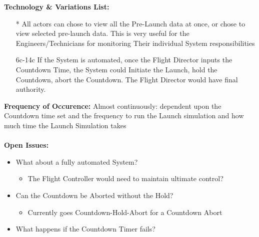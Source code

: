 \documentclass[letterpaper]{article}
\begin{document}
\textbf{Technology \& Variations List: }
\begin{itemize}
\item[*] All actors can chose to view all the Pre-Launch data at once,
or chose to view selected pre-launch data.  This is very useful for the
Engineers/Technicians for monitoring Their individual System
responsibilities
\item [6c-14c]If the System is automated, once the Flight Director
inputs the Countdown Time, the System could Initiate the Launch, 
hold the Countdown, abort the Countdown.  The Flight Director would
have final authority.
\end{itemize}
\textbf{Frequency of Occurence:  }  Almost continuously:  dependent
upon the Countdown time set and the frequency to run the Launch
simulation and how much time the Launch Simulation takes\\\\
\textbf{Open Issues:  }
\begin{itemize}
\item What about a fully automated System?
\begin{itemize}
\item The Flight Controller would need to maintain ultimate control?
\end{itemize}
\item Can the Countdown be Aborted without the Hold?
\begin{itemize}
\item Currently goes Countdown-Hold-Abort for a Countdown Abort
\end{itemize}
\item What happens if the Countdown Timer fails?
\end{itemize}
\end{document}
